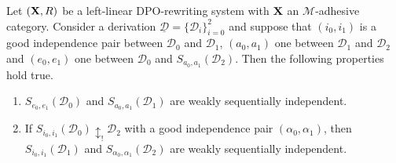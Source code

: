 \documentclass[a4paper,UKenglish,cleveref,pdftex, thm-restate,numberwithinsect]{lipics}
\def\R{\mathsf{R}}
\def\X{\textbf {\textup{X}}}
\newcommand{\dder}[1]{\mathscr{#1}}
\newcommand{\der}[1]{\underline{\dder{#1}}}
\begin{document}
\begin{lemma}\label{lem:iig1}Let $(\X,\R)$ be a left-linear DPO-rewriting system with $\X$ an $\mathcal{M}$-adhesive category. Consider a derivation $\der{D}=\{\dder{D}_i\}_{i=0}^2$ and suppose that $(i_0,i_1)$ is a good independence pair between $\dder{D}_0$ and $\dder{D}_1$, $(a_0,a_1)$ one between $\dder{D}_1$ and $\dder{D}_2$ and $(e_0, e_1)$ one between $\dder{D}_0$ and $S_{a_0,a_1}(\dder{D}_2)$. Then the following properties hold true.
	\begin{enumerate}
		\item $S_{e_0,e_1}(\dder{D}_0)$ and $S_{a_0,a_1}(\dder{D}_1)$ are weakly sequentially independent.
		\item If $S_{i_0, i_1}(\dder{D}_0)\updownarrow_! \dder{D}_2$ with a good independence pair $(\alpha_0, \alpha_1)$, then  $S_{i_0,i_1}(\dder{D}_1)$ and $S_{\alpha_0, \alpha_1}(\dder{D}_2)$ are weakly sequentially independent.
	\end{enumerate}
	
\end{lemma}
\end{document}
